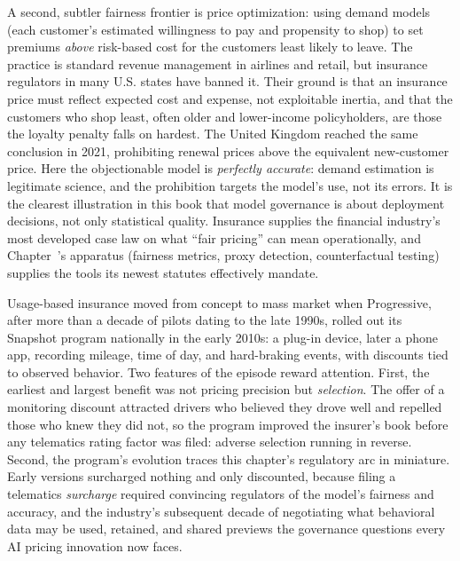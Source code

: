 \documentclass[../ai_in_finance]{subfiles}
\begin{document}
A second, subtler fairness frontier is price optimization: using demand models (each customer's estimated willingness to pay and propensity to shop) to set premiums \emph{above} risk-based cost for the customers least likely to leave. The practice is standard revenue management in airlines and retail, but insurance regulators in many U.S. states have banned it. Their ground is that an insurance price must reflect expected cost and expense, not exploitable inertia, and that the customers who shop least, often older and lower-income policyholders, are those the loyalty penalty falls on hardest. The United Kingdom reached the same conclusion in 2021, prohibiting renewal prices above the equivalent new-customer price. Here the objectionable model is \emph{perfectly accurate}: demand estimation is legitimate science, and the prohibition targets the model's use, not its errors. It is the clearest illustration in this book that model governance is about deployment decisions, not only statistical quality. Insurance supplies the financial industry's most developed case law on what ``fair pricing'' can mean operationally, and Chapter~'s apparatus (fairness metrics, proxy detection, counterfactual testing) supplies the tools its newest statutes effectively mandate.

\label{sec:ins-vignette}

Usage-based insurance moved from concept to mass market when Progressive, after more than a decade of pilots dating to the late 1990s, rolled out its Snapshot program nationally in the early 2010s: a plug-in device, later a phone app, recording mileage, time of day, and hard-braking events, with discounts tied to observed behavior. Two features of the episode reward attention. First, the earliest and largest benefit was not pricing precision but \emph{selection}. The offer of a monitoring discount attracted drivers who believed they drove well and repelled those who knew they did not, so the program improved the insurer's book before any telematics rating factor was filed: adverse selection running in reverse. Second, the program's evolution traces this chapter's regulatory arc in miniature. Early versions surcharged nothing and only discounted, because filing a telematics \emph{surcharge} required convincing regulators of the model's fairness and accuracy, and the industry's subsequent decade of negotiating what behavioral data may be used, retained, and shared previews the governance questions every AI pricing innovation now faces.
\end{document}
